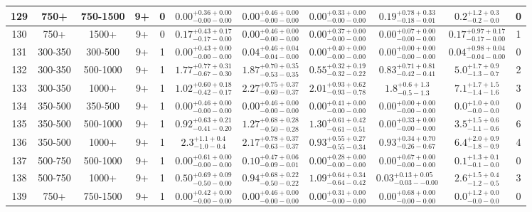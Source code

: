 \documentclass[11pt, oneside]{article}
\begin{document}
\begin{table}
{\begin{tabular}{ |c|c|c|c|c||c|c|c|c||c|c| }
129 & 750+ & 750-1500 & 9+ & 0 & $0.00^{+0.36+0.00}_{-0.00-0.00}$ & $0.00^{+0.46+0.00}_{-0.00-0.00}$ & $0.00^{+0.33+0.00}_{-0.00-0.00}$ & $0.19^{+0.78+0.33}_{-0.18-0.01}$ & $0.2^{+1.2+0.3}_{-0.2-0.0}$ & 0 \\ \hline
130 & 750+ & 1500+ & 9+ & 0 & $0.17^{+0.43+0.17}_{-0.17-0.00}$ & $0.00^{+0.46+0.00}_{-0.00-0.00}$ & $0.00^{+0.37+0.00}_{-0.00-0.00}$ & $0.00^{+0.07+0.00}_{-0.00-0.00}$ & $0.17^{+0.97+0.17}_{-0.17-0.00}$ & 1 \\ \hline
131 & 300-350 & 300-500 & 9+ & 1 & $0.00^{+0.43+0.00}_{-0.00-0.00}$ & $0.04^{+0.46+0.04}_{-0.04-0.00}$ & $0.00^{+0.40+0.00}_{-0.00-0.00}$ & $0.00^{+0.00+0.00}_{-0.00-0.00}$ & $0.04^{+0.98+0.04}_{-0.04-0.00}$ & 0 \\ \hline
132 & 300-350 & 500-1000 & 9+ & 1 & $1.77^{+0.77+0.31}_{-0.67-0.30}$ & $1.87^{+0.70+0.35}_{-0.53-0.35}$ & $0.55^{+0.32+0.19}_{-0.32-0.22}$ & $0.83^{+0.71+0.81}_{-0.42-0.41}$ & $5.0^{+1.7+0.9}_{-1.3-0.7}$ & 2 \\ \hline
133 & 300-350 & 1000+ & 9+ & 1 & $1.02^{+0.60+0.18}_{-0.42-0.17}$ & $2.27^{+0.75+0.37}_{-0.60-0.37}$ & $2.01^{+0.93+0.62}_{-0.93-0.78}$ & $1.8^{+0.6+1.3}_{-0.5-1.3}$ & $7.1^{+1.7+1.5}_{-1.4-1.6}$ & 3 \\ \hline
134 & 350-500 & 350-500 & 9+ & 1 & $0.00^{+0.46+0.00}_{-0.00-0.00}$ & $0.00^{+0.46+0.00}_{-0.00-0.00}$ & $0.00^{+0.41+0.00}_{-0.00-0.00}$ & $0.00^{+0.00+0.00}_{-0.00-0.00}$ & $0.0^{+1.0+0.0}_{-0.0-0.0}$ & 0 \\ \hline
135 & 350-500 & 500-1000 & 9+ & 1 & $0.92^{+0.63+0.21}_{-0.41-0.20}$ & $1.27^{+0.68+0.28}_{-0.50-0.28}$ & $1.30^{+0.61+0.42}_{-0.61-0.51}$ & $0.00^{+0.33+0.00}_{-0.00-0.00}$ & $3.5^{+1.5+0.6}_{-1.1-0.6}$ & 6 \\ \hline
136 & 350-500 & 1000+ & 9+ & 1 & $2.3^{+1.1+0.4}_{-1.0-0.4}$ & $2.17^{+0.78+0.37}_{-0.63-0.37}$ & $0.93^{+0.55+0.27}_{-0.55-0.34}$ & $0.93^{+0.34+0.70}_{-0.26-0.67}$ & $6.4^{+2.0+0.9}_{-1.8-0.9}$ & 4 \\ \hline
137 & 500-750 & 500-1000 & 9+ & 1 & $0.00^{+0.61+0.00}_{-0.00-0.00}$ & $0.10^{+0.47+0.06}_{-0.09-0.01}$ & $0.00^{+0.28+0.00}_{-0.00-0.00}$ & $0.00^{+0.67+0.00}_{-0.00-0.00}$ & $0.1^{+1.3+0.1}_{-0.1-0.0}$ & 0 \\ \hline
138 & 500-750 & 1000+ & 9+ & 1 & $0.50^{+0.69+0.09}_{-0.50-0.00}$ & $0.94^{+0.68+0.22}_{-0.50-0.22}$ & $1.09^{+0.64+0.34}_{-0.64-0.42}$ & $0.03^{+0.13+0.05}_{-0.03--0.00}$ & $2.6^{+1.5+0.4}_{-1.2-0.5}$ & 3 \\ \hline
139 & 750+ & 750-1500 & 9+ & 1 & $0.00^{+0.42+0.00}_{-0.00-0.00}$ & $0.00^{+0.46+0.00}_{-0.00-0.00}$ & $0.00^{+0.31+0.00}_{-0.00-0.00}$ & $0.00^{+0.68+0.00}_{-0.00-0.00}$ & $0.0^{+1.2+0.0}_{-0.0-0.0}$ & 0 \\ \hline

\end{tabular}}
\end{table}
\end{document}
